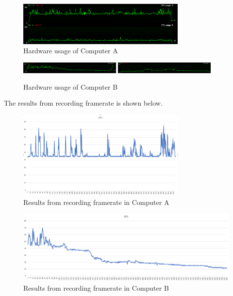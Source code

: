 \begin{figure}[H]
\centering
\includegraphics[width=0.75\textwidth]{InternalTest/B_usage.PNG}
\caption{Hardware usage of Computer A}
\end{figure}

\begin{figure}[H]
\centering
\includegraphics[width=0.45\textwidth]{InternalTest/C_gpu.PNG}
\includegraphics[width=0.45\textwidth]{InternalTest/C_cpu.PNG}
\caption{Hardware usage of Computer B}
\end{figure}

The results from recording framerate is shown below.

\begin{figure}[H]
\centering
\includegraphics[width=0.75\textwidth]{InternalTest/A_fps.PNG}
\caption{Results from recording framerate in Computer A}
\end{figure}

\begin{figure}[H]
\centering
\includegraphics[scale=1]{InternalTest/B_fps.PNG}
\caption{Results from recording framerate in Computer B}
\end{figure}


